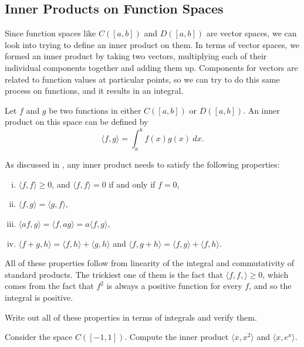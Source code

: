 \subsection{Inner Products on Function Spaces}

Since function spaces like $C([a,b])$ and $D([a,b])$ are vector spaces, we can look into trying to define an inner product on them. In terms of vector spaces, we formed an inner product by taking two vectors, multiplying each of their individual components together and adding them up. Components for vectors are related to function values at particular points, so we can try to do this same process on functions, and it results in an integral.

\begin{definition}
Let $f$ and $g$ be two functions in either $C([a,b])$ or $D([a,b])$. An inner product on this space can be defined by
\[ \langle f, g \rangle = \int_a^b f(x)g(x)\ dx. \]
\end{definition}

As discussed in , any inner product needs to satisfy the following properties:
\begin{enumerate}[(i)]
\item $\langle f , f \rangle \geq 0$, and
$\langle f , f \rangle = 0$ if and only if $f = 0$,
\item $\langle f , g \rangle = \langle g ,f
\rangle$,
\item $\langle af , g\rangle =
\langle f , ag \rangle =
a \langle f , g \rangle$,
\item $\langle f +  g , h \rangle =
\langle f , h \rangle +
\langle g, h \rangle$ and
$\langle f, g + h \rangle =
\langle f , g \rangle +
\langle f , h \rangle$.
\end{enumerate}

All of these properties follow from linearity of the integral and commutativity of standard products. The trickiest one of them is the fact that $\langle f, f, \rangle \geq 0$, which comes from the fact that $f^2$ is always a positive function for every $f$, and so the integral is positive.

\begin{exercise}
Write out all of these properties in terms of integrals and verify them.
\end{exercise}

\begin{example}
Consider the space $C([-1,1])$. Compute the inner product $\langle x, x^2 \rangle$ and $\langle x, e^x \rangle$. 
\end{example}

